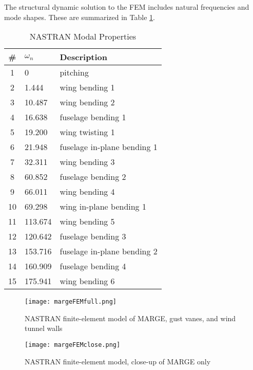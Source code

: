 The structural dynamic solution to the FEM includes natural frequencies and mode shapes. These are summarized in Table \ref{tab:nastranResult}.
\begin{table}[H]
	\centering
	\caption{NASTRAN Modal Properties}
	\label{tab:nastranResult}
	\begin{tabular}{cll}
		\hline\hline
		\# & $\omega_n$ & Description \\
		\hline
		1  &   0     & pitching \\
		2  &   1.444 & wing bending 1 \\
		3  &  10.487 & wing bending 2 \\
		4  &  16.638 & fuselage bending 1 \\
		5  &  19.200 & wing twisting 1 \\
		6  &  21.948 & fuselage in-plane bending 1 \\
		7  &  32.311 & wing bending 3 \\
		8  &  60.852 & fuselage bending 2 \\
		9  &  66.011 & wing bending 4 \\
		10 &  69.298 & wing in-plane bending 1 \\
		11 & 113.674 & wing bending 5 \\
		12 & 120.642 & fuselage bending 3 \\
		13 & 153.716 & fuselage in-plane bending 2  \\
		14 & 160.909 & fuselage bending 4 \\
		15 & 175.941 & wing bending 6 \\
		\hline\hline
	\end{tabular}
\end{table}


\begin{landscape}

\begin{figure}[h]
	\centering
	\texttt{[image: margeFEMfull.png]}
	\caption{NASTRAN finite-element model of MARGE, gust vanes, and wind tunnel walls}
	\label{fig:nastranWindowFull}
\end{figure}
\begin{figure}[h]
	\centering
	\texttt{[image: margeFEMclose.png]}
	\caption{NASTRAN finite-element model, close-up of MARGE only}
	\label{fig:nastranWindowClose}
\end{figure}

\end{landscape}